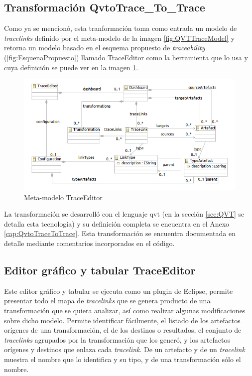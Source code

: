 \documentclass[a4paper,12pt,oneside,spanish]{book}
\begin{document}
\subsection{Transformación QvtoTrace{\_}To{\_}Trace}

Como ya se mencionó, esta tranformación toma como entrada un modelo de \textit{tracelinks} definido por el meta-modelo de la imagen \ref{fig:QVTTraceModel} y retorna un modelo basado en el esquema propuesto de \textit{traceability} (\ref{fig:EsquenaPropuesto}) llamado \textsf{TraceEditor} como la herramienta que lo usa y cuya definición se puede ver en la imagen \ref{fig:TraceEditorMetaModel}.


\begin{figure}[hbtp]
\centering
\includegraphics[scale=.61]{./img/TraceEditorMetaModel}
\caption{Meta-modelo TraceEditor}
\label{fig:TraceEditorMetaModel}
\end{figure}


La transformación se desarrolló con el lenguaje \gls{qvt} (en la sección \ref{sec:QVT} se detalla esta tecnología) y su definición completa se encuentra en el Anexo \ref{cap:QvtoTraceToTrace}. Esta transformación se encuentra documentada en detalle mediante comentarios incorporados en el código.



\subsection{Editor gráfico y tabular TraceEditor}

Este editor gráfico y tabular se ejecuta como un plugin de \textsf{Eclipse}, permite presentar todo el mapa de \textit{tracelinks} que se genera producto de una transformación que se quiera analizar, así como realizar algunas modificaciones sobre dicho modelo. Permite identificar fácilmente, el listado de los artefactos orígenes de una transformación, el de los destinos o resultados, el conjunto de \textit{tracelinks} agrupados por la transformación que los generó, y los artefactos orígenes y destinos que enlaza cada \textit{tracelink}. De un artefacto y de un \textit{tracelink} muestra el nombre que lo identifica y su tipo, y de una transformación sólo el nombre.
\end{document}
